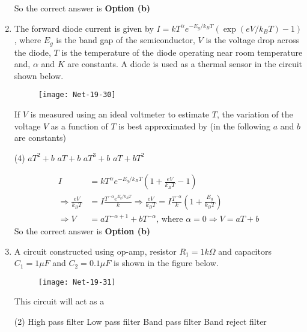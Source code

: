 \begin{enumerate}
\begin{tasks}
\end{tasks}
\begin{answer}
	So the correct answer is \textbf{Option (b)}
\end{answer}
\item The forward diode current is given by $I=k T^{\alpha} e^{-E_{g} / k_{B} T}\left(\exp \left(e V / k_{B} T\right)-1\right)$, where $E_{g}$ is the band gap of the semiconductor, $V$ is the voltage drop across the diode, $T$ is the temperature of the diode operating near room temperature and, $\alpha$ and $K$ are constants. A diode is used as a thermal sensor in the circuit shown below.
\begin{figure}[H]
	\centering
	\texttt{[image: Net-19-30]}
\end{figure}
If $V$ is measured using an ideal voltmeter to estimate $T$, the variation of the voltage $V$ as a function of $T$ is best approximated by (in the following $a$ and $b$ are constants)
 \begin{tasks}(4)
	\task[\textbf{a.}] $a T^{2}+b$
	\task[\textbf{b.}] $a T+b$
	\task[\textbf{c.}] $a T^{3}+b$
	\task[\textbf{d.}] $a T+b T^{2}$
\end{tasks}
\begin{answer}
	\begin{align*}
	I&=k T^{\alpha} e^{-E_{g} / k_{B} T}\left(1+\frac{e V}{k_{B} T}-1\right)\\
	\Rightarrow \frac{e V}{k_{B} T}&=I \frac{T^{-\alpha} e^{E_{g} / k_{B} T}}{k} \Rightarrow \frac{e V}{k_{B} T}=I \frac{T^{-\alpha}}{k}\left(1+\frac{E_{g}}{k_{B} T}\right) \\
	\Rightarrow V&=a T^{-\alpha+1}+b T^{-\alpha} \text {, where } \alpha=0 \Rightarrow V=a T+b
	\end{align*}
		So the correct answer is \textbf{Option (b)}
\end{answer}
\item A circuit constructed using op-amp, resistor $R_{1}=1 k \Omega$ and capacitors $C_{1}=1 \mu F$ and $C_{2}=0.1 \mu F$ is shown in the figure below.
\begin{figure}[H]
	\centering
	\texttt{[image: Net-19-31]}
\end{figure}
This circuit will act as a
 \begin{tasks}(2)
	\task[\textbf{a.}]High pass filter
	\task[\textbf{b.}]Low pass filter
	\task[\textbf{c.}]Band pass filter
	\task[\textbf{d.}]Band reject filter 
\end{tasks}
\begin{answer}

\end{answer}
\end{enumerate}
